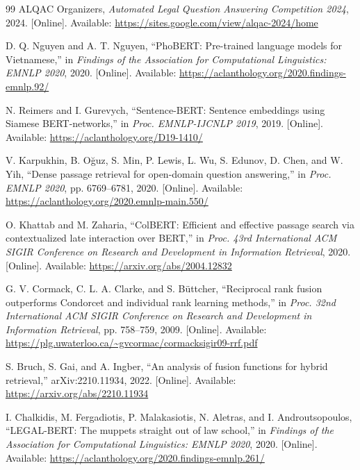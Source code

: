 \begin{thebibliography}{99}
ALQAC Organizers, \emph{Automated Legal Question Answering Competition 2024}, 2024. [Online]. Available: \href{https://sites.google.com/view/alqac-2024/home}{https://sites.google.com/view/alqac-2024/home}

D. Q. Nguyen and A. T. Nguyen, ``PhoBERT: Pre-trained language models for Vietnamese,'' in \emph{Findings of the Association for Computational Linguistics: EMNLP 2020}, 2020. [Online]. Available: \href{https://aclanthology.org/2020.findings-emnlp.92/}{https://aclanthology.org/2020.findings-emnlp.92/}

N. Reimers and I. Gurevych, ``Sentence-BERT: Sentence embeddings using Siamese BERT-networks,'' in \emph{Proc. EMNLP-IJCNLP 2019}, 2019. [Online]. Available: \href{https://aclanthology.org/D19-1410/}{https://aclanthology.org/D19-1410/}

V. Karpukhin, B. Oğuz, S. Min, P. Lewis, L. Wu, S. Edunov, D. Chen, and W. Yih, ``Dense passage retrieval for open-domain question answering,'' in \emph{Proc. EMNLP 2020}, pp. 6769--6781, 2020. [Online]. Available: \href{https://aclanthology.org/2020.emnlp-main.550/}{https://aclanthology.org/2020.emnlp-main.550/}

O. Khattab and M. Zaharia, ``ColBERT: Efficient and effective passage search via contextualized late interaction over BERT,'' in \emph{Proc. 43rd International ACM SIGIR Conference on Research and Development in Information Retrieval}, 2020. [Online]. Available: \href{https://arxiv.org/abs/2004.12832}{https://arxiv.org/abs/2004.12832}

G. V. Cormack, C. L. A. Clarke, and S. Büttcher, ``Reciprocal rank fusion outperforms Condorcet and individual rank learning methods,'' in \emph{Proc. 32nd International ACM SIGIR Conference on Research and Development in Information Retrieval}, pp. 758--759, 2009. [Online]. Available: \href{https://plg.uwaterloo.ca/~gvcormac/cormacksigir09-rrf.pdf}{https://plg.uwaterloo.ca/\textasciitilde gvcormac/cormacksigir09-rrf.pdf}

S. Bruch, S. Gai, and A. Ingber, ``An analysis of fusion functions for hybrid retrieval,'' arXiv:2210.11934, 2022. [Online]. Available: \href{https://arxiv.org/abs/2210.11934}{https://arxiv.org/abs/2210.11934}

I. Chalkidis, M. Fergadiotis, P. Malakasiotis, N. Aletras, and I. Androutsopoulos, ``LEGAL-BERT: The muppets straight out of law school,'' in \emph{Findings of the Association for Computational Linguistics: EMNLP 2020}, 2020. [Online]. Available: \href{https://aclanthology.org/2020.findings-emnlp.261/}{https://aclanthology.org/2020.findings-emnlp.261/}


\end{thebibliography}
